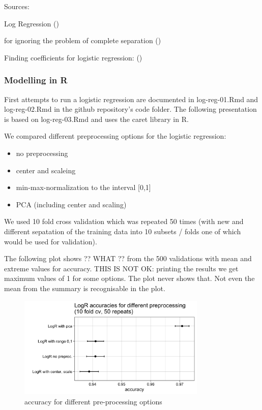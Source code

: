 \documentclass[]{article}
\providecommand{\tightlist}{%
  \setlength{\itemsep}{0pt}\setlength{\parskip}{0pt}}
\begin{document}
Sources:

Log Regression (\cite{logreg})

for ignoring the problem of complete separation (\cite{ucla})

Finding coefficients for logistic regression: (\cite{newton})

\subsubsection{Modelling in R}\label{modelling-in-r}

First attempts to run a logistic regression are documented in
log-reg-01.Rmd and log-reg-02.Rmd in the github repository's code
folder. The following presentation is based on log-reg-03.Rmd and uses
the caret library in R.

We compared different preprocessing options for the logistic regression:

\begin{itemize}
\tightlist
\item
  no preprocessing
\item
  center and scaleing
\item
  min-max-normalization to the interval {[}0,1{]}
\item
  PCA (including center and scaling)
\end{itemize}

We used 10 fold cross validation which was repeated 50 times (with new
and different sepatation of the training data into 10 subsets / folds
one of which would be used for validation).

The following plot shows ?? WHAT ?? from the 500 validations with mean
and extreme values for accuracy. THIS IS NOT OK: printing the results we
get maximum values of 1 for some options. The plot never shows that. Not
even the mean from the summary is recognisable in the plot.

\begin{figure}
    \centering
    \includegraphics[width=0.8\textwidth]{images/preprocessing-options.png}
    \caption{accuracy for different pre-processing options}
    \label{fig:pre-proc-options}
\end{figure}
\end{document}
